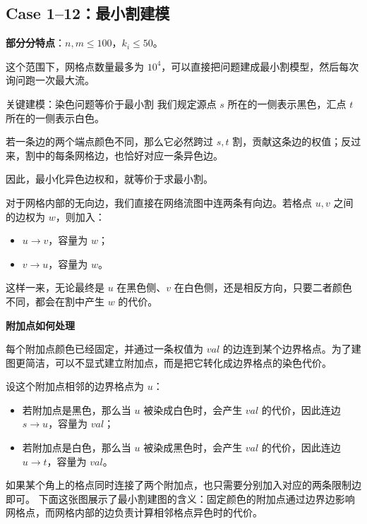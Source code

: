 \documentclass{book}
\begin{document}
\subsection{Case 1--12：最小割建模}

\textbf{部分分特点}：$n,m\le 100$，$k_i\le 50$。

这个范围下，网格点数量最多为 $10^4$，可以直接把问题建成最小割模型，然后每次询问跑一次最大流。

\begin{keybox}{关键建模：染色问题等价于最小割}
我们规定源点 $s$ 所在的一侧表示黑色，汇点 $t$ 所在的一侧表示白色。

若一条边的两个端点颜色不同，那么它必然跨过 $s,t$ 割，贡献这条边的权值；反过来，割中的每条网格边，也恰好对应一条异色边。

因此，最小化异色边权和，就等价于求最小割。
\end{keybox}

对于网格内部的无向边，我们直接在网络流图中连两条有向边。若格点 $u,v$ 之间的边权为 $w$，则加入：

\begin{itemize}[leftmargin=2em,itemsep=1pt,topsep=2pt,parsep=0pt,partopsep=0pt]
    \item $u\to v$，容量为 $w$；
    \item $v\to u$，容量为 $w$。
\end{itemize}

这样一来，无论最终是 $u$ 在黑色侧、$v$ 在白色侧，还是相反方向，只要二者颜色不同，都会在割中产生 $w$ 的代价。

\par\medskip
\noindent\textbf{附加点如何处理}
\par\medskip

每个附加点颜色已经固定，并通过一条权值为 $val$ 的边连到某个边界格点。为了建图更简洁，可以不显式建立附加点，而是把它转化成边界格点的染色代价。

设这个附加点相邻的边界格点为 $u$：

\begin{itemize}[leftmargin=2em,itemsep=1pt,topsep=2pt,parsep=0pt,partopsep=0pt]
    \item 若附加点是黑色，那么当 $u$ 被染成白色时，会产生 $val$ 的代价，因此连边 $s\to u$，容量为 $val$；
    \item 若附加点是白色，那么当 $u$ 被染成黑色时，会产生 $val$ 的代价，因此连边 $u\to t$，容量为 $val$。
\end{itemize}

如果某个角上的格点同时连接了两个附加点，也只需要分别加入对应的两条限制边即可。
\newpage
下面这张图展示了最小割建图的含义：固定颜色的附加点通过边界边影响网格点，而网格内部的边负责计算相邻格点异色时的代价。
\end{document}
